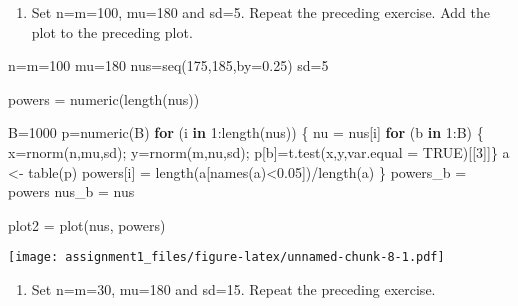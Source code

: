\documentclass[
]{article}
\newenvironment{Shaded}{\begin{snugshade}}{\end{snugshade}}
\newcommand{\AttributeTok}[1]{\textcolor[rgb]{0.77,0.63,0.00}{#1}}
\newcommand{\ConstantTok}[1]{\textcolor[rgb]{0.00,0.00,0.00}{#1}}
\newcommand{\ControlFlowTok}[1]{\textcolor[rgb]{0.13,0.29,0.53}{\textbf{#1}}}
\newcommand{\DecValTok}[1]{\textcolor[rgb]{0.00,0.00,0.81}{#1}}
\newcommand{\FloatTok}[1]{\textcolor[rgb]{0.00,0.00,0.81}{#1}}
\newcommand{\FunctionTok}[1]{\textcolor[rgb]{0.00,0.00,0.00}{#1}}
\newcommand{\NormalTok}[1]{#1}
\newcommand{\OtherTok}[1]{\textcolor[rgb]{0.56,0.35,0.01}{#1}}
\newcommand{\SpecialCharTok}[1]{\textcolor[rgb]{0.00,0.00,0.00}{#1}}
\providecommand{\tightlist}{%
  \setlength{\itemsep}{0pt}\setlength{\parskip}{0pt}}
\begin{document}
\begin{enumerate}
\def\labelenumi{\alph{enumi})}
\setcounter{enumi}{1}
\tightlist
\item
  Set n=m=100, mu=180 and sd=5. Repeat the preceding exercise. Add the
  plot to the preceding plot.
\end{enumerate}

\begin{Shaded}
\begin{Highlighting}[]
\NormalTok{n}\OtherTok{=}\NormalTok{m}\OtherTok{=}\DecValTok{100}
\NormalTok{mu}\OtherTok{=}\DecValTok{180}
\NormalTok{nus}\OtherTok{=}\FunctionTok{seq}\NormalTok{(}\DecValTok{175}\NormalTok{,}\DecValTok{185}\NormalTok{,}\AttributeTok{by=}\FloatTok{0.25}\NormalTok{)}
\NormalTok{sd}\OtherTok{=}\DecValTok{5}

\NormalTok{powers }\OtherTok{=} \FunctionTok{numeric}\NormalTok{(}\FunctionTok{length}\NormalTok{(nus))}

\NormalTok{B}\OtherTok{=}\DecValTok{1000}
\NormalTok{p}\OtherTok{=}\FunctionTok{numeric}\NormalTok{(B)}
\ControlFlowTok{for}\NormalTok{ (i }\ControlFlowTok{in} \DecValTok{1}\SpecialCharTok{:}\FunctionTok{length}\NormalTok{(nus)) \{}
\NormalTok{  nu }\OtherTok{=}\NormalTok{ nus[i]}
  \ControlFlowTok{for}\NormalTok{ (b }\ControlFlowTok{in} \DecValTok{1}\SpecialCharTok{:}\NormalTok{B) \{}
\NormalTok{    x}\OtherTok{=}\FunctionTok{rnorm}\NormalTok{(n,mu,sd);}
\NormalTok{    y}\OtherTok{=}\FunctionTok{rnorm}\NormalTok{(m,nu,sd);}
\NormalTok{    p[b]}\OtherTok{=}\FunctionTok{t.test}\NormalTok{(x,y,}\AttributeTok{var.equal =} \ConstantTok{TRUE}\NormalTok{)[[}\DecValTok{3}\NormalTok{]]\}}
\NormalTok{  a }\OtherTok{\textless{}{-}} \FunctionTok{table}\NormalTok{(p)}
\NormalTok{  powers[i] }\OtherTok{=} \FunctionTok{length}\NormalTok{(a[}\FunctionTok{names}\NormalTok{(a)}\SpecialCharTok{\textless{}}\FloatTok{0.05}\NormalTok{])}\SpecialCharTok{/}\FunctionTok{length}\NormalTok{(a)}
\NormalTok{\} }
\NormalTok{powers\_b }\OtherTok{=}\NormalTok{ powers}
\NormalTok{nus\_b }\OtherTok{=}\NormalTok{ nus}

\NormalTok{plot2 }\OtherTok{=} \FunctionTok{plot}\NormalTok{(nus, powers)}
\end{Highlighting}
\end{Shaded}

\texttt{[image: assignment1\_files/figure-latex/unnamed-chunk-8-1.pdf]}

\begin{enumerate}
\def\labelenumi{\alph{enumi})}
\setcounter{enumi}{2}
\tightlist
\item
  Set n=m=30, mu=180 and sd=15. Repeat the preceding exercise.
\end{enumerate}
\end{document}

